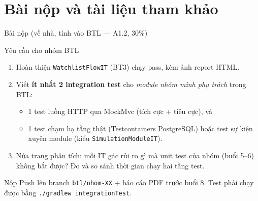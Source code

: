 \documentclass[aspectratio=169,12pt]{beamer}
\begin{document}
\section{Bài nộp và tài liệu tham khảo}

\begin{frame}{Bài nộp (về nhà, tính vào BTL --- A1.2, 30\%)}
  \begin{block}{Yêu cầu cho nhóm BTL}
    \begin{enumerate}\small
      \item Hoàn thiện \texttt{WatchlistFlowIT} (BT3) chạy pass, kèm ảnh
        report HTML.
      \item Viết \textbf{ít nhất 2 integration test} cho \emph{module nhóm
        mình phụ trách} trong BTL:
        \begin{itemize}
          \item 1 test luồng HTTP qua MockMvc (tích cực + tiêu cực), và
          \item 1 test chạm hạ tầng thật (Testcontainers PostgreSQL) hoặc
            test sự kiện xuyên module (kiểu \texttt{SimulationModuleIT}).
        \end{itemize}
      \item Nửa trang phân tích: mỗi IT gác rủi ro gì mà unit test của nhóm
        (buổi 5--6) không bắt được? Đo và so sánh thời gian chạy hai tầng test.
    \end{enumerate}
  \end{block}
  \begin{alertblock}{Nộp}
    Push lên branch \texttt{btl/nhom-XX} + báo cáo PDF trước buổi 8.
    Test phải chạy được bằng \texttt{./gradlew integrationTest}.
  \end{alertblock}
\end{frame}
\end{document}
